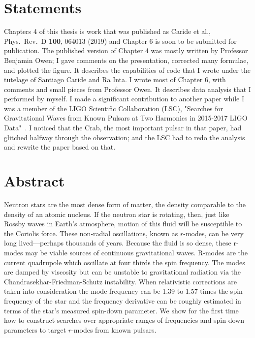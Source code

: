 \documentclass{ttuthes2007}
\begin{document}
\chapter{Statements}
Chapters 4 of this thesis is work that was published as Caride et al., Phys.\
Rev.\ D \textbf{100}, 064013 (2019) and Chapter 6 is soon to be submitted for
publication. The published version of Chapter 4 was mostly written by Professor
Benjamin Owen; I gave comments on the presentation, corrected many formulae, and
plotted the figure. It describes the capabilities of code that I wrote under the
tutelage of Santiago Caride and Ra Inta. I wrote most of Chapter 6, with
comments and small pieces from Professor Owen. It describes data analysis that I
performed by myself. I made a significant contribution to another paper while I
was a member of the LIGO Scientific Collaboration (LSC), "Searches for
Gravitational Waves from Known Pulsars at Two Harmonics in 2015-2017 LIGO
Data"~\cite{Abbott1_2019}.  I noticed that the Crab, the most important pulsar
in that paper, had glitched halfway through the observation; and the LSC had to
redo the analysis and rewrite the paper based on that.

\tableofcontents	%

\chapter{\textbf{Abstract}}
Neutron stars are the most dense form of matter, the density comparable to the
density of an atomic nucleus. If the neutron star is rotating, then, just like
Rossby waves in Earth's atmosphere, motion of this fluid will be susceptible to the
Coriolis force. These non-radial oscillations, known as $r$-modes, can be very
long lived---perhaps thousands of years. Because the fluid is so dense, these
r-modes may be viable sources of continuous gravitational waves.  R-modes are
the current quadrupole which oscillate at four thirds the spin frequency. The
modes are damped by viscosity but can be unstable to gravitational radiation via
the Chandrasekhar-Friedman-Schutz instability. When relativistic corrections are
taken into consideration the mode frequency can be 1.39 to 1.57 times the spin
frequency of the star and the frequency derivative can be roughly estimated in
terms of the star's measured spin-down parameter. We show for the first time how
to construct searches over appropriate ranges of frequencies and spin-down
parameters to target $r$-modes from known pulsars. 
\end{document}

